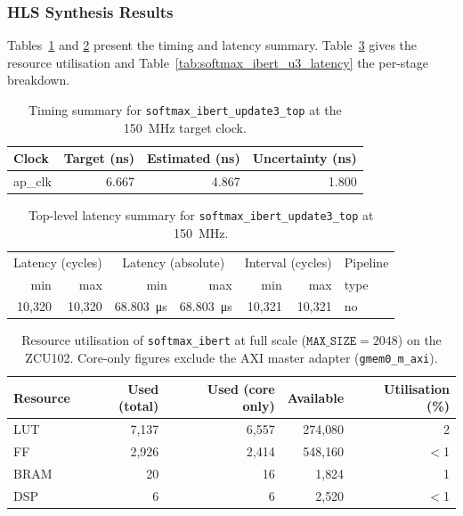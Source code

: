 \subsubsection{HLS Synthesis Results}
\label{subsubsec:softmax_ibert_update3_csyn}

Tables~\ref{tab:softmax_ibert_u3_timing} and
\ref{tab:softmax_ibert_u3_top_latency} present the timing and latency
summary. Table~\ref{tab:softmax_ibert_u3_resources} gives the resource
utilisation and Table~\ref{tab:softmax_ibert_u3_latency} the per-stage
breakdown.

\begin{table}[H]
  \centering
  \begin{tabular}{lrrr}
    \toprule
    Clock & Target (ns) & Estimated (ns) & Uncertainty (ns) \\
    \midrule
    ap\_clk & 6.667 & 4.867 & 1.800 \\
    \bottomrule
  \end{tabular}
  \caption{Timing summary for \texttt{softmax\_ibert\_update3\_top} at the
           \SI{150}{\mega\hertz} target clock.}
  \label{tab:softmax_ibert_u3_timing}
\end{table}

\begin{table}[H]
  \centering
  \begin{tabular}{rrrrrrl}
    \toprule
    \multicolumn{2}{c}{Latency (cycles)} &
    \multicolumn{2}{c}{Latency (absolute)} &
    \multicolumn{2}{c}{Interval (cycles)} & Pipeline \\
    min & max & min & max & min & max & type \\
    \midrule
    10{,}320 & 10{,}320 & \SI{68.803}{\micro\second} & \SI{68.803}{\micro\second} & 10{,}321 & 10{,}321 & no \\
    \bottomrule
  \end{tabular}
  \caption{Top-level latency summary for \texttt{softmax\_ibert\_update3\_top}
           at \SI{150}{\mega\hertz}.}
  \label{tab:softmax_ibert_u3_top_latency}
\end{table}

\begin{table}[H]
  \centering
  \begin{tabular}{lrrrr}
    \toprule
    Resource & Used (total) & Used (core only) & Available & Utilisation (\%) \\
    \midrule
    LUT  & 7{,}137 & 6{,}557 & 274{,}080 & 2 \\
    FF   & 2{,}926 & 2{,}414 & 548{,}160 & $<$1 \\
    BRAM &      20 &      16 &   1{,}824 & 1 \\
    DSP  &       6 &       6 &   2{,}520 & $<$1 \\
    \bottomrule
  \end{tabular}
  \caption{Resource utilisation of \texttt{softmax\_ibert} at full scale
           ($\texttt{MAX\_SIZE} = 2048$) on the ZCU102. Core-only figures
           exclude the AXI master adapter (\texttt{gmem0\_m\_axi}).}
  \label{tab:softmax_ibert_u3_resources}
\end{table}

